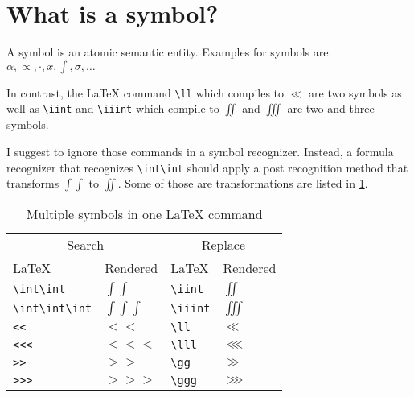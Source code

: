 \section{What is a symbol?}
A symbol is an atomic semantic entity. Examples for symbols are: $\alpha, \propto, \cdot, x, \int, \sigma, \dots$

In contrast, the \LaTeX{} command \verb+\ll+ which compiles to $\ll$ are two
symbols as well as \verb+\iint+ and \verb+\iiint+ which compile to $\iint$ and
$\iiint$ are two and three symbols. 

I suggest to ignore those commands in a symbol recognizer. Instead, a formula
recognizer that recognizes \verb+\int\int+ should apply a post recognition method
that transforms $\int\int$ to $\iint$. Some of those are transformations are
listed in \cref{table:postprocessing-formula-recognizer}.

\begin{table}[ht]
    \centering
    \begin{tabular}{ll|ll}
        \toprule
        \multicolumn{2}{c|}{Search}           & \multicolumn{2}{c}{Replace} \\
        \LaTeX{}            & Rendered       & \LaTeX{}      & Rendered \\\midrule
        \verb+\int\int+     & $\int\int$     & \verb+\iint+  & $\iint$ \\
        \verb+\int\int\int+ & $\int\int\int$ & \verb+\iiint+ & $\iiint$ \\
        \verb+<<+           & $<<$           & \verb+\ll+    & $\ll$ \\
        \verb+<<<+          & $<<<$          & \verb+\lll+   & $\lll$ \\
        \verb+>>+           & $>>$           & \verb+\gg+    & $\gg$ \\
        \verb+>>>+          & $>>>$          & \verb+\ggg+   & $\ggg$ \\
        \bottomrule
    \end{tabular}
    \caption{Multiple symbols in one \LaTeX{} command}
    \label{table:postprocessing-formula-recognizer}
\end{table}